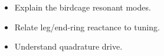 \begin{objectives}
\begin{itemize}[leftmargin=1.4em,itemsep=2pt]
\item Explain the birdcage resonant modes.
\item Relate leg/end-ring reactance to tuning.
\item Understand quadrature drive.
\end{itemize}
\end{objectives}

